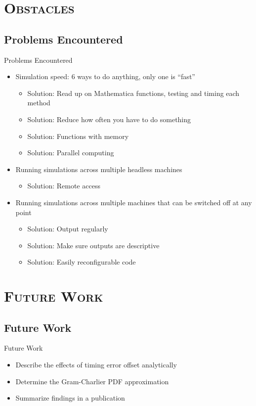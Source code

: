 \documentclass[xcolor=x11names,compress]{beamer}
\renewcommand{\(}{\begin{columns}}
\renewcommand{\)}{\end{columns}}
\newcommand{\<}[1]{\begin{column}{#1}}
\renewcommand{\>}{\end{column}}
\begin{document}
\section{\scshape Obstacles}
\subsection{Problems Encountered}
\begin{frame}{Problems Encountered}
\begin{itemize}
\item<2-> Simulation speed: 6 ways to do anything, only one is “fast”
	\begin{itemize}
	\item Solution: Read up on Mathematica functions, testing and timing each method
	\item Solution: Reduce how often you have to do something
	\item Solution: Functions with memory
	\item Solution: Parallel computing
	\end{itemize}
\item<3-> Running simulations across multiple headless machines
	\begin{itemize}
	\item Solution: Remote access
	\end{itemize}
\item<4-> Running simulations across multiple machines that can be switched off at any point
	\begin{itemize}
	\item Solution: Output regularly
	\item Solution: Make sure outputs are descriptive
	\item Solution: Easily reconfigurable code
	\end{itemize}
\end{itemize}
\end{frame}

\section{\scshape Future Work}
\subsection{Future Work}
\begin{frame}{Future Work}
\begin{itemize}
\item<2-> Describe the effects of timing error offset analytically
\item<3-> Determine the Gram-Charlier PDF approximation
\item<4-> Summarize findings in a publication
\end{itemize}
\end{frame}
\end{document}
